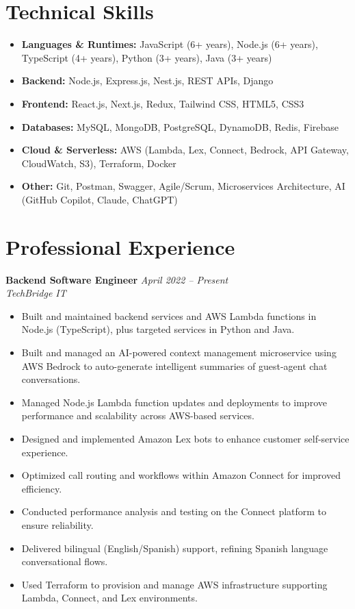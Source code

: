 \documentclass[10pt,letterpaper]{article}
\begin{document}
\section*{Technical Skills}
\begin{itemize}
    \item \textbf{Languages \& Runtimes:} JavaScript (6+ years), Node.js (6+ years), TypeScript (4+ years), Python (3+ years), Java (3+ years)
    \item \textbf{Backend:} Node.js, Express.js, Nest.js, REST APIs, Django
    \item \textbf{Frontend:} React.js, Next.js, Redux, Tailwind CSS, HTML5, CSS3
    \item \textbf{Databases:} MySQL, MongoDB, PostgreSQL, DynamoDB, Redis, Firebase
    \item \textbf{Cloud \& Serverless:} AWS (Lambda, Lex, Connect, Bedrock, API Gateway, CloudWatch, S3), Terraform, Docker
    \item \textbf{Other:} Git, Postman, Swagger, Agile/Scrum, Microservices Architecture, AI (GitHub Copilot, Claude, ChatGPT)
\end{itemize}

\section*{Professional Experience}

\textbf{Backend Software Engineer} \hfill \textit{April 2022 -- Present}\\
\textit{TechBridge IT}
\begin{itemize}
    \item Built and maintained backend services and AWS Lambda functions in Node.js (TypeScript), plus targeted services in Python and Java.
    \item Built and managed an AI-powered context management microservice using AWS Bedrock to auto-generate intelligent summaries of guest-agent chat conversations.
    \item Managed Node.js Lambda function updates and deployments to improve performance and scalability across AWS-based services.
    \item Designed and implemented Amazon Lex bots to enhance customer self-service experience.
    \item Optimized call routing and workflows within Amazon Connect for improved efficiency.
    \item Conducted performance analysis and testing on the Connect platform to ensure reliability.
    \item Delivered bilingual (English/Spanish) support, refining Spanish language conversational flows.
    \item Used Terraform to provision and manage AWS infrastructure supporting Lambda, Connect, and Lex environments.
\end{itemize}
\end{document}
